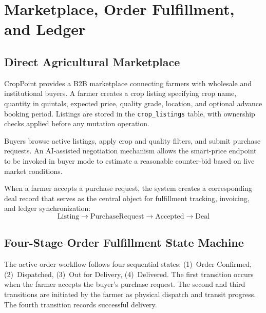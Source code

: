 \documentclass[conference]{IEEEtran}
\begin{document}
\section{Marketplace, Order Fulfillment, and Ledger}

\subsection{Direct Agricultural Marketplace}

CropPoint provides a B2B marketplace connecting farmers with
wholesale and institutional buyers. A farmer creates a crop listing
specifying crop name, quantity in quintals, expected price, quality
grade, location, and optional advance booking period. Listings are
stored in the \texttt{crop\_listings} table, with ownership checks
applied before any mutation operation.

Buyers browse active listings, apply crop and quality filters, and
submit purchase requests. An AI-assisted negotiation mechanism
allows the smart-price endpoint to be invoked in buyer mode to
estimate a reasonable counter-bid based on live market conditions.

When a farmer accepts a purchase request, the system creates a
corresponding deal record that serves as the central object for
fulfillment tracking, invoicing, and ledger synchronization:
\begin{equation}
\mathrm{Listing}
\rightarrow \mathrm{PurchaseRequest}
\rightarrow \mathrm{Accepted}
\rightarrow \mathrm{Deal}
\end{equation}

\subsection{Four-Stage Order Fulfillment State Machine}

The active order workflow follows four sequential states:
(1)~Order Confirmed, (2)~Dispatched, (3)~Out for Delivery,
(4)~Delivered. The first transition occurs when the farmer accepts
the buyer's purchase request. The second and third transitions are
initiated by the farmer as physical dispatch and transit progress.
The fourth transition records successful delivery.
\end{document}

